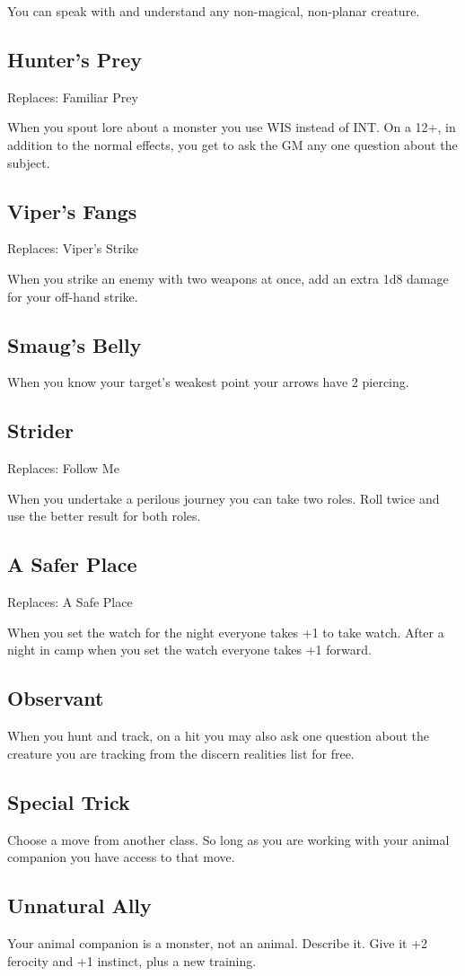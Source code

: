  You can speak with and understand any non-magical, non-planar creature.
\subsection{Hunter's Prey}


 Replaces: Familiar Prey


 When you spout lore about a monster you use WIS instead of INT\@. On a 12+, in addition to the normal effects, you get to ask the GM any one question about the subject.
\subsection{Viper's Fangs}


 Replaces: Viper's Strike


 When you strike an enemy with two weapons at once, add an extra 1d8 damage for your off-hand strike.
\subsection{Smaug's Belly}


 When you know your target's weakest point your arrows have 2 piercing.
\subsection{Strider}


 Replaces: Follow Me


 When you undertake a perilous journey you can take two roles. Roll twice and use the better result for both roles.
\subsection{A Safer Place}


 Replaces: A Safe Place


 When you set the watch for the night everyone takes +1 to take watch. After a night in camp when you set the watch everyone takes +1 forward.
\subsection{Observant}


 When you hunt and track, on a hit you may also ask one question about the creature you are tracking from the discern realities list for free.
\subsection{Special Trick}


 Choose a move from another class. So long as you are working with your animal companion you have access to that move.
\subsection{Unnatural Ally}


 Your animal companion is a monster, not an animal. Describe it. Give it +2 ferocity and +1 instinct, plus a new training.


